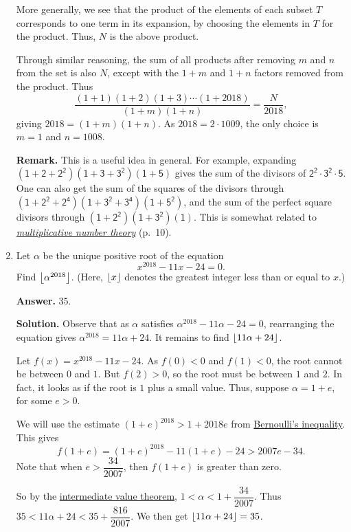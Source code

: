 \documentclass[11pt,paper=letter]{scrartcl}
\begin{document}
\begin{enumerate}[left=0pt]
More generally, we see that the product of the elements of each subset $T$ corresponds to one term in its expansion, by choosing the elements in $T$ for the product. Thus, $N$ is the above product.

Through similar reasoning, the sum of all products after removing $m$ and $n$ from the set is also $N$, except with the $1 + m$ and $1 + n$ factors removed from the product. Thus $$\frac{(1 + 1)(1 + 2)(1 + 3) \cdots (1 + 2018)}{(1+m)(1+n)} = \frac{N}{2018},$$ giving $2018 = (1 + m)(1 + n)$. As $2018 = 2 \cdot 1009$, the only choice is $m = 1$ and $n = 1008$.

{\small \sffamily \textbf{Remark.} This is a useful idea in general. For example, expanding $\mathsf{(1 + 2 + 2^2)(1 + 3 + 3^2)(1 + 5)}$ gives the sum of the divisors of $\mathsf{2^2 \cdot 3^2 \cdot 5}$. One can also get the sum of the squares of the divisors through $\mathsf{(1 + 2^2 + 2^4)(1 + 3^2 + 3^4)(1 + 5^2)}$, and the sum of the perfect square divisors through $\mathsf{(1 + 2^2)(1 + 3^2)(1)}$. This is somewhat related to \href{http://web.evanchen.cc/handouts/Summation/Summation.pdf}{\emph{multiplicative number theory}} (p.~10).}

\item Let $\alpha$ be the unique positive root of the equation $$x^{2018} - 11x - 24 = 0.$$ Find $\left\lfloor \alpha^{2018} \right\rfloor$. (Here, $\left\lfloor x \right\rfloor$ denotes the greatest integer less than or equal to $x$.)

{\sffamily \bfseries Answer.} $\boxed{35}$.

{\sffamily \bfseries Solution.} Observe that as $\alpha$ satisfies $\alpha^{2018} - 11\alpha - 24 = 0$, rearranging the equation gives $\alpha^{2018} = 11\alpha + 24$. It remains to find $\left\lfloor 11\alpha + 24 \right\rfloor$.

Let $f(x) = x^{2018} - 11x - 24$. As $f(0) < 0$ and $f(1) < 0$, the root cannot be between $0$ and $1$. But $f(2) > 0$, so the root must be between $1$ and $2$. In fact, it looks as if the root is $1$ plus a small value. Thus, suppose $\alpha = 1 + e$, for some $e > 0$.

We will use the estimate $(1 + e)^{2018} > 1 + 2018e$ from \href{https://en.wikipedia.org/wiki/Bernoulli%27s_inequality}{Bernoulli's inequality}. This gives $$f(1 + e) = (1 + e)^{2018} - 11(1 + e) - 24 > 2007e - 34.$$ Note that when $e > \dfrac{34}{2007}$, then $f(1+e)$ is greater than zero.

So by the \href{https://en.wikipedia.org/wiki/Intermediate_value_theorem}{intermediate value theorem}, $1 < \alpha < 1 + \dfrac{34}{2007}$. Thus $35 < 11\alpha + 24 < 35 + \dfrac{816}{2007}$. We then get $\left\lfloor 11 \alpha + 24 \right\rfloor = 35$.


\end{enumerate}
\end{document}
